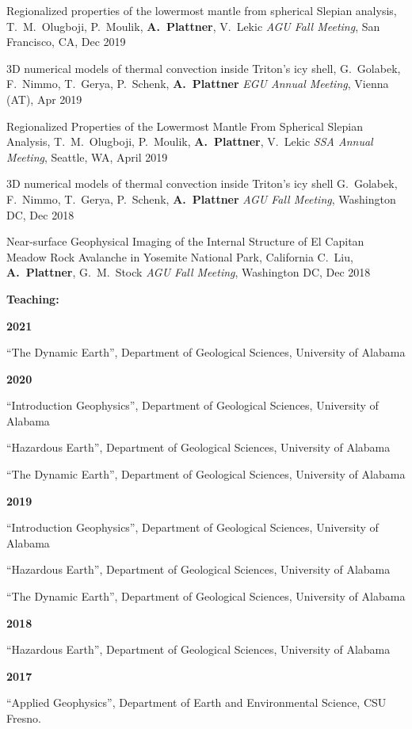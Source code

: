 \documentclass[10pt]{article}
\begin{document}
\spcp
Regionalized properties of the lowermost mantle from spherical Slepian analysis,
T.~M.~Olugboji, P.~Moulik, \textbf{A.~Plattner}, V.~Lekic
\emph{AGU Fall Meeting}, San Francisco, CA, Dec 2019

\spcp
3D numerical models of thermal convection inside Triton’s icy shell, G.~Golabek, F.~Nimmo, T.~Gerya, P.~Schenk, \textbf{A.~Plattner}
\emph{EGU Annual Meeting}, Vienna (AT), Apr 2019

\spcp
Regionalized Properties of the Lowermost Mantle From Spherical Slepian Analysis,
T.~M.~Olugboji, P.~Moulik, \textbf{A.~Plattner}, V.~Lekic
\emph{SSA Annual Meeting}, Seattle, WA, April 2019

\spcp
3D numerical models of thermal convection inside Triton's icy shell
G.~Golabek, F.~Nimmo, T.~Gerya, P.~Schenk, \textbf{A.~Plattner}
\emph{AGU Fall Meeting}, Washington DC, Dec 2018

\spcp
Near-surface Geophysical Imaging of the Internal Structure of El Capitan Meadow Rock Avalanche in Yosemite National Park, California
C.~Liu, \textbf{A.~Plattner}, G.~M.~Stock
\emph{AGU Fall Meeting}, Washington DC, Dec 2018



\spc
\textbf{\tsize Teaching:}

\spcp
\textbf{2021}

``The Dynamic Earth'', Department of Geological Sciences, University of Alabama

\spcp
\textbf{2020}

``Introduction Geophysics'', Department of Geological Sciences,
University of Alabama

``Hazardous Earth'', Department of Geological Sciences, University of Alabama

``The Dynamic Earth'', Department of Geological Sciences, University of Alabama


\spcp
\textbf{2019}

``Introduction Geophysics'', Department of Geological Sciences,
University of Alabama

``Hazardous Earth'', Department of Geological Sciences, University of Alabama

``The Dynamic Earth'', Department of Geological Sciences, University of Alabama

\spcp
\textbf{2018}

``Hazardous Earth'', Department of Geological Sciences, University of Alabama

\spcp
\textbf{2017}

``Applied Geophysics'', Department of Earth and Environmental Science, CSU Fresno.
\end{document}
